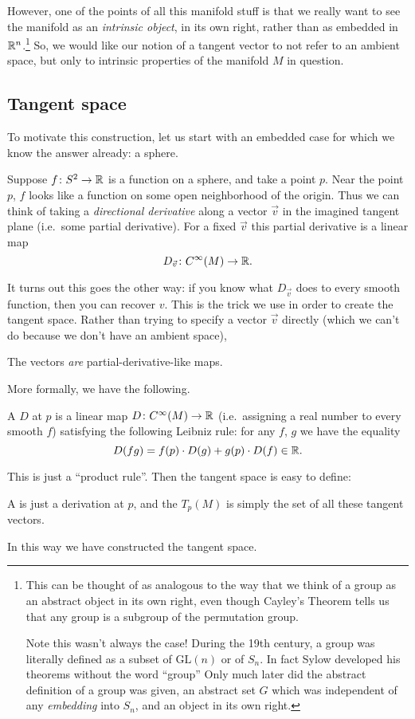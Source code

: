 However, one of the points of all this manifold stuff
is that we really want to see the manifold
as an \emph{intrinsic object}, in its own right,
rather than as embedded in $\mathbb R^n$.\footnote{This
	can be thought of as analogous to the way
	that we think of a group as an abstract object in its own right,
	even though Cayley's Theorem tells us that any group is a subgroup
	of the permutation group.

	Note this wasn't always the case!
	During the 19th century, a group was literally defined
	as a subset of $\text{GL}(n)$ or of $S_n$.
	In fact Sylow developed his theorems without the word ``group''
	Only much later did the abstract definition of a group was given,
	an abstract set $G$ which was independent of any \emph{embedding} into $S_n$,
	and an object in its own right.}
So, we would like our notion of a tangent vector to not refer to an ambient space,
but only to intrinsic properties of the manifold $M$ in question.

\subsection{Tangent space}
To motivate this construction, let us start
with an embedded case for which we know the answer already:
a sphere.

Suppose $f \colon S^2 \to \mathbb R$ is a
function on a sphere, and take a point $p$.
Near the point $p$, $f$ looks like a function
on some open neighborhood of the origin.
Thus we can think of taking a \emph{directional derivative}
along a vector $\vec v$ in the imagined tangent plane
(i.e.\ some partial derivative).
For a fixed $\vec v$ this partial derivative is a linear map
\[ D_{\vec v} \colon C^\infty(M) \to \mathbb R. \]

It turns out this goes the other way:
if you know what $D_{\vec v}$ does to every smooth function,
then you can recover $v$.
This is the trick we use in order to create the tangent space.
Rather than trying to specify a vector $\vec v$ directly
(which we can't do because we don't have an ambient space),
\begin{moral}
	The vectors \emph{are} partial-derivative-like maps.
\end{moral}
More formally, we have the following.
\begin{definition}
	A  $D$ at $p$ is a linear map
	$D \colon C^\infty(M) \to \mathbb R$
	(i.e.\ assigning a real number to every smooth $f$)
	satisfying the following Leibniz rule:
	for any $f$, $g$ we have the equality
	\[ D(fg) = f(p) \cdot D(g) + g(p) \cdot D(f) \in \mathbb R. \]
\end{definition}
This is just a ``product rule''.
Then the tangent space is easy to define:
\begin{definition}
	A  is just a derivation at $p$, and
	the  $T_p(M)$ is simply
	the set of all these tangent vectors.
\end{definition}
In this way we have constructed the tangent space.

